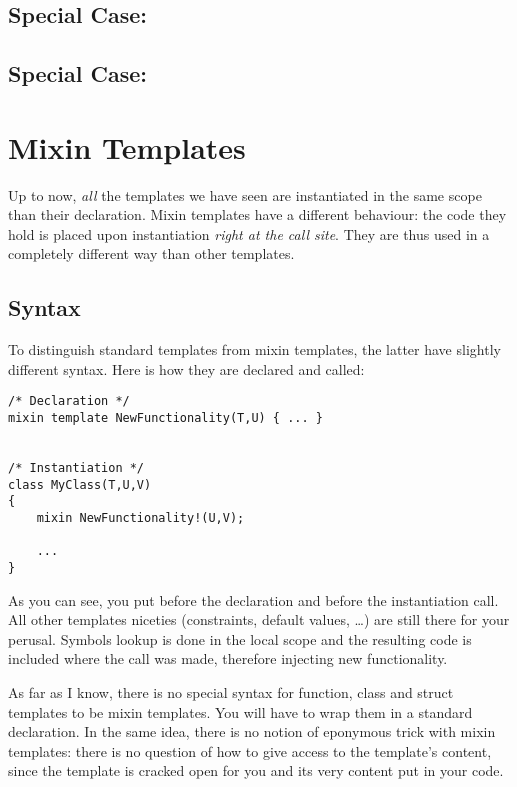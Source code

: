 \subsection{Special Case: }

\subsection{Special Case: }

\section{Mixin Templates}\label{mixintemplates}

Up to now, \emph{all} the templates we have seen are instantiated in the same scope than their declaration. Mixin templates have a different behaviour: the code they hold is placed upon instantiation \emph{right at the call site}. They are thus used in a completely different way than other templates.

\subsection{Syntax}\label{mixintemplatessyntax}

To distinguish standard templates from mixin templates, the latter have slightly different syntax. Here is how they are declared and called:

\begin{verbatim}
/* Declaration */
mixin template NewFunctionality(T,U) { ... }


/* Instantiation */
class MyClass(T,U,V)
{
    mixin NewFunctionality!(U,V);

    ...
}
\end{verbatim}

As you can see, you put  before the declaration and  before the instantiation call. All other templates niceties (constraints, default values, \ldots) are still there for your perusal. Symbols lookup is done in the local scope and the resulting code is included where the call was made, therefore injecting new functionality.

As far as I know, there is no special syntax for function, class and struct templates to be mixin templates. You will have to wrap them in a standard  declaration. In the same idea, there is no notion of eponymous trick with mixin templates: there is no question of how to give access to the template's content, since the template is cracked open for you and its very content put in your code.

